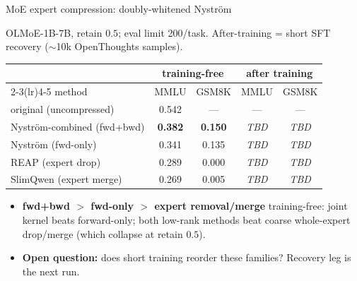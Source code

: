 \documentclass[9pt]{beamer}
\begin{document}
	\begin{frame}{MoE expert compression: doubly-whitened Nystr\"om}
		

		\vspace{0.5em}
		{\footnotesize OLMoE-1B-7B, retain $0.5$; eval limit 200/task. After-training =
			short SFT recovery ($\sim$10k OpenThoughts samples).}
		
		\vspace{0.2em}
		{\footnotesize
			\begin{tabular}{@{}lcccc@{}}
				\toprule
				& \multicolumn{2}{c}{training-free} & \multicolumn{2}{c}{after training} \\
				\cmidrule(lr){2-3}\cmidrule(lr){4-5}
				method & MMLU & GSM8K & MMLU & GSM8K \\
				\midrule
				original (uncompressed)     & 0.542 & ---   & ---   & ---   \\
				\midrule
				Nystr\"om-combined (fwd+bwd) & \textbf{0.382} & \textbf{0.150} & \emph{TBD} & \emph{TBD} \\
				Nystr\"om (fwd-only)         & 0.341 & 0.135 & \emph{TBD} & \emph{TBD} \\
				REAP (expert drop)           & 0.289 & 0.000 & \emph{TBD} & \emph{TBD} \\
				SlimQwen (expert merge)      & 0.269 & 0.005 & \emph{TBD} & \emph{TBD} \\
				\bottomrule
		\end{tabular}}
		
		\vspace{0.5em}
		\begin{itemize}
			\item \textbf{fwd+bwd $>$ fwd-only $>$ expert removal/merge} training-free:
			joint kernel beats forward-only; both low-rank methods beat coarse
			whole-expert drop/merge (which collapse at retain $0.5$).
			\item \textbf{Open question:} does short training reorder these families?
			Recovery leg is the next run.
		\end{itemize}
		
	\end{frame}
	
\end{document}
